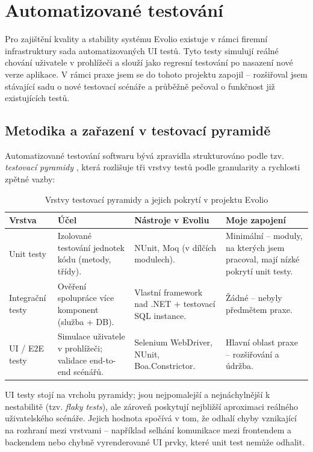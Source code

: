 \chapter{Automatizované testování}
\label{chap:testing}

Pro zajištění kvality a stability systému Evolio existuje v rámci firemní infrastruktury sada automatizovaných UI testů. Tyto testy simulují reálné chování uživatele v prohlížeči a slouží jako regresní testování po nasazení nové verze aplikace. V rámci praxe jsem se do tohoto projektu zapojil -- rozšiřoval jsem stávající sadu o nové testovací scénáře a průběžně pečoval o funkčnost již existujících testů.

\section{Metodika a zařazení v testovací pyramidě}

Automatizované testování softwaru bývá zpravidla strukturováno podle tzv. \textit{testovací pyramidy} \cite{fowler_test_pyramid, meszaros_xunit}, která rozlišuje tři vrstvy testů podle granularity a rychlosti zpětné vazby:

\begin{table}[H]
\centering
\caption{Vrstvy testovací pyramidy a jejich pokrytí v projektu Evolio}
\label{tab:test_pyramid}
\begin{tabular}{|l|p{4cm}|p{3.5cm}|p{3.5cm}|}
\hline
\textbf{Vrstva} & \textbf{Účel} & \textbf{Nástroje v Evoliu} & \textbf{Moje zapojení} \\ \hline
Unit testy & Izolované testování jednotek kódu (metody, třídy). & NUnit, Moq (v dílčích modulech). & Minimální -- moduly, na kterých jsem pracoval, mají nízké pokrytí unit testy. \\ \hline
Integrační testy & Ověření spolupráce více komponent (služba + DB). & Vlastní framework nad .NET + testovací SQL instance. & Žádné -- nebyly předmětem praxe. \\ \hline
UI / E2E testy & Simulace uživatele v prohlížeči; validace end-to-end scénářů. & Selenium WebDriver, NUnit, Boa.Constrictor. & Hlavní oblast praxe -- rozšiřování a údržba. \\ \hline
\end{tabular}
\end{table}

UI testy stojí na vrcholu pyramidy; jsou nejpomalejší a nejnáchylnější k nestabilitě (tzv. \textit{flaky tests}), ale zároveň poskytují nejbližší aproximaci reálného uživatelského scénáře. Jejich hodnota spočívá v tom, že odhalí chyby vznikající na rozhraní mezi vrstvami -- například selhání komunikace mezi frontendem a backendem nebo chybně vyrenderované UI prvky, které unit test nemůže odhalit.

